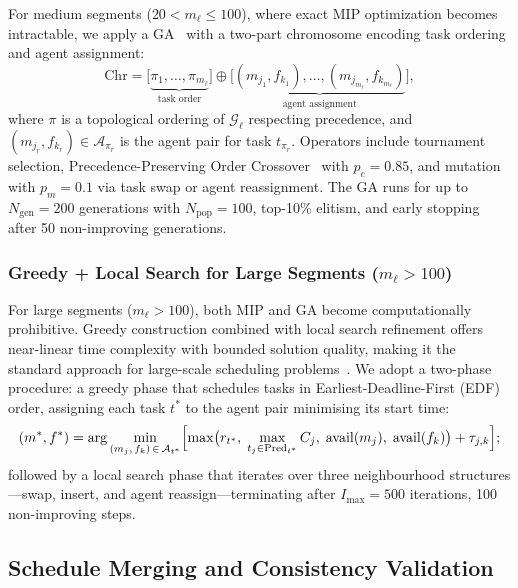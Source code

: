 \documentclass[manuscript,screen,review]{acmart}
\begin{document}
For medium segments ($20 < m_\ell \leq 100$), where exact MIP
optimization becomes intractable, we apply a GA~\cite{baker2018principles}
with a two-part chromosome encoding task ordering and agent assignment:
\begin{equation}
    \mathrm{Chr} =
    \bigl[\underbrace{\pi_1,\ldots,\pi_{m_\ell}}_{\text{task order}}\bigr]
    \oplus
    \bigl[\underbrace{(m_{j_1},f_{k_1}),\ldots,(m_{j_{m_\ell}},
    f_{k_{m_\ell}})}_{\text{agent assignment}}\bigr],
    \label{eq:chromosome}
\end{equation}
where $\pi$ is a topological ordering of $\mathcal{G}_\ell$ respecting
precedence, and $(m_{j_r}, f_{k_r}) \in \mathcal{A}_{\pi_r}$ is the agent
pair for task $t_{\pi_r}$. 
Operators include tournament selection, Precedence-Preserving Order
Crossover~\cite{baker2018principles} with $p_c = 0.85$, and mutation
with $p_m = 0.1$ via task swap or agent reassignment.
The GA runs for up to $N_{\mathrm{gen}} = 200$ generations with
$N_{\mathrm{pop}} = 100$, top-10\% elitism, and early stopping
after 50 non-improving generations.

\subsubsection{Greedy + Local Search for Large Segments ($m_\ell > 100$)}

For large segments ($m_\ell > 100$), both MIP and GA become computationally
prohibitive. Greedy construction combined with local search refinement offers
near-linear time complexity with bounded solution quality, making it the
standard approach for large-scale scheduling
problems~\cite{baker2018principles}. We adopt a two-phase
procedure: a greedy phase that schedules tasks in Earliest-Deadline-First
(EDF) order, assigning each task $t^*$ to the agent pair minimising its
start time:
\begin{equation}
    (m^*, f^*) = \arg\min_{(m_j,\,f_k)\,\in\,\mathcal{A}_{t^*}}
    \Bigl[\max\bigl(r_{t^*},\;
          \max_{t_j \in \mathrm{Pred}_{t^*}} C_j,\;
          \mathrm{avail}(m_j),\;\mathrm{avail}(f_k)\bigr)
    + \tau_{j,k}\Bigr];
    \label{eq:greedy_assign}
\end{equation}
followed by a local search phase that iterates over three neighbourhood
structures---swap, insert, and agent reassign---terminating after
$I_{\max} = 500$ iterations, 100 non-improving steps.

\subsection{Schedule Merging and Consistency Validation}
\label{subsec:merging}
\end{document}
